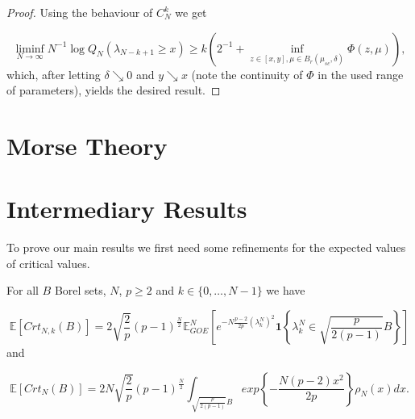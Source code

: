 \begin{proof}
	Using the behaviour of $C_N^k$ we get
	
	\begin{equation*}
		\liminf_{N\rightarrow\infty}N^{-1}\log Q_N(\lambda_{N-k+1}\geq x)\geq k(2^{-1} + \inf_{z\in[x,y],\mu\in B_r(\mu_{sc},\delta)}\Phi(z,\mu)),
	\end{equation*}
	which, after letting $\delta\searrow 0$ and $y\searrow x$ (note the continuity of $\Phi$ in the used range of parameters), yields the desired result.
\end{proof}

\section{Morse Theory}

\section{Intermediary Results}
To prove our main results we first need some refinements for the expected values of critical values.

\begin{theorem}
	For all $B$ Borel sets, $N$, $p\geq 2$ and $k\in\{0,\dots,N-1\}$ we have

	\begin{equation}\label{thm:2.1}
		\mathbb E[Crt_{N,k}(B)]=2\sqrt{\frac{2}{p}}(p-1)^{\frac{N}{2}}\mathbb E_{GOE}^N\left[e^{-N\frac{p-2}{2p}(\lambda_k^N)^2}\bm 1\left\{\lambda_k^N\in\sqrt{\frac{p}{2(p-1)}}B \right\}\right]
	\end{equation} and
	
	\begin{equation}\label{thm:2.2}
		\mathbb E[Crt_N(B)]=2N\sqrt{\frac{2}{p}}(p-1)^{\frac{N}{2}}\int_{\sqrt{\frac{p}{2(p-1)}}B}exp\left\{-\frac{N(p-2)x^2}{2p}\right\}\rho_N(x)dx.
	\end{equation}
\end{theorem}









